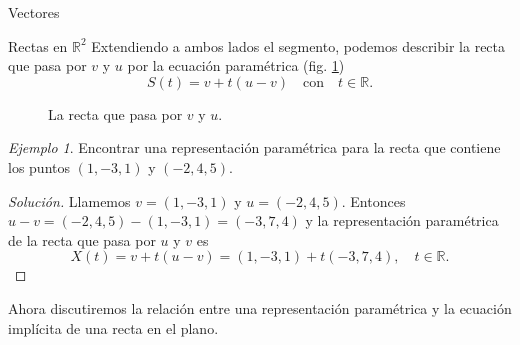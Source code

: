 \documentclass[a4paper,12pt,twoside,spanish,reqno]{amsbook}
\numberwithin{equation}{section}
\theoremstyle{definition}
\theoremstyle{remark}
\newtheorem*{ejemplo*}{Ejemplo}
\newcommand{\R}{\mathbb R}
\begin{document}
\begin{chapter}{Vectores}
\begin{section}{Rectas en $\R^2$}
        Extendiendo a ambos lados el segmento, podemos describir la recta que pasa por $v$ y $u$ por la ecuación paramétrica (fig. \ref{fig-recta-entre-puntos})
        \begin{equation*}
        S(t) = v + t(u-v)\quad  \text{con}\quad t \in \R.
        \end{equation*}
        \begin{figure}[h]
            \caption{La recta que pasa por $v$ y $u$.}
            \label{fig-recta-entre-puntos}
        \end{figure} 
        
        \begin{ejemplo*}
            Encontrar una representación paramétrica para la recta que contiene los puntos $(1, - 3, 1)$ y $(- 2,4,5)$.
        \end{ejemplo*}	
        \begin{proof}[Solución] Llamemos $v = (1, - 3, 1)$ y $u =(- 2,4,5)$. Entonces $u-v = (- 2,4,5) - (1,-3,1) = (-3,7,4)$ y la representación paramétrica de la recta que pasa por $u$ y $v$  es 
        \begin{equation*}
            X (t) = v + t(u-v) = (1, -3,1) + t (-3, 7, 4),\quad t\in \R.
        \end{equation*}
        \end{proof}
    
        Ahora discutiremos la relación entre una representación paramétrica y la ecuación implícita de una recta en el plano.
        

\end{section}
\end{chapter}
\end{document}

